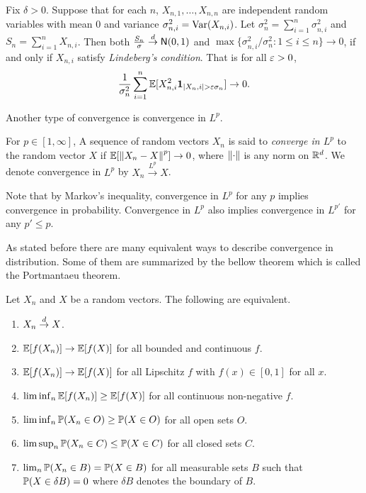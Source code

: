 \begin{theorem}
    Fix $\delta > 0$. Suppose that for each $n$, $X_{n,1},\ldots,X_{n,n}$ are independent random variables with mean $0$ and variance $\sigma_{n,i}^2 = \operatorname{Var}(X_{n,i})$. Let $\sigma_n^2 = \sum_{i=1}^n \sigma_{n,i}^2$ and $S_n = \sum_{i=1}^n X_{n,i}$. Then both $\frac{S_n}{\sigma} \stackrel{d}{\to} \mathsf{N}(0,1)$ and $\max\{\sigma_{n,i}^2/\sigma_n^2: 1 \le i \le n \} \to 0$, if and only if $X_{n,i}$ satisfy \emph{Lindeberg's condition}. That is for all $\varepsilon > 0$,
    \[\frac{1}{\sigma_n^2}\sum_{i=1}^n {\mathbb{E}}[X_{n,i}^2 {{\bf 1}}_{{\left\lvert X_n,i\right\rvert} > \varepsilon \sigma_n}] \to 0. \]
\end{theorem}
Another type of convergence is convergence in $L^p$.
\begin{definition}
    For $p \in [1,\infty]$, A sequence of random vectors $X_n$ is said to \emph{converge in $L^p$} to the random vector $X$ if ${\mathbb{E}}[\left\|X_n-X\right\|^p] \to 0$, where $\left\|\cdot\right\|$ is any norm on ${\mathbb R}^d$. We denote convergence in $L^p$ by $X_n \stackrel{L^p}{\to} X$. 
\end{definition}
Note that by Markov's inequality, convergence in $L^p$ for any $p$ implies convergence in probability. Convergence in $L^p$ also implies convergence in $L^{p'}$ for any $p' \le p$.

As stated before there are many equivalent ways to describe convergence in distribution. Some of them are summarized by the bellow theorem which is called the Portmantaeu theorem.
\begin{theorem}
    Let $X_n$ and $X$ be a random vectors. The following are equivalent.
    \begin{enumerate}
        \item $X_n \stackrel{d}{\to} X$.
        \item ${\mathbb{E}}[f(X_n)] \to {\mathbb{E}}[f(X)]$ for all bounded and continuous $f$.
        \item ${\mathbb{E}}[f(X_n)] \to {\mathbb{E}}[f(X)]$ for all Lipschitz $f$ with $f(x) \in [0,1]$ for all $x$.
        \item $\lim\inf_n {\mathbb{E}}[f(X_n)] \ge {\mathbb{E}}[f(X)]$ for all continuous non-negative $f$.
        \item $\liminf_n {\mathbb{P}}(X_n \in O) \ge {\mathbb{P}}(X\in O)$ for all open sets $O$.
        \item $\limsup_n {\mathbb{P}}(X_n \in C) \le {\mathbb{P}}(X \in C)$ for all closed sets $C$.
        \item $\lim_n {\mathbb{P}}(X_n \in B) = {\mathbb{P}}(X\in B)$ for all measurable sets $B$ such that ${\mathbb{P}}(X \in \delta B) = 0$ where $\delta B$ denotes the boundary of $B$. 
    \end{enumerate}
\end{theorem}
